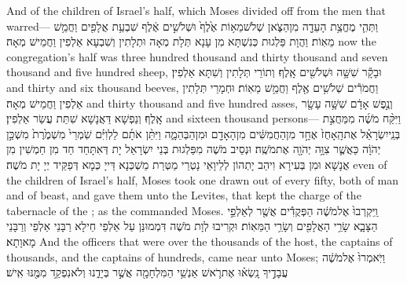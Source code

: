 {And of the children of Israel’s half, which Moses divided off from the men that warred—}{}
{וַתְּהִ֛י מֶחֱצַ֥ת הָעֵדָ֖ה מִן\maqqaf הַצֹּ֑אן שְׁלֹשׁ\maqqaf מֵא֥וֹת אֶ֙לֶף֙ וּשְׁלֹשִׁ֣ים אֶ֔לֶף שִׁבְעַ֥ת אֲלָפִ֖ים וַחֲמֵ֥שׁ מֵאֽוֹת׃}
{וַהֲוָת פַּלְגוּת כְּנִשְׁתָּא מִן עָנָא תְּלָת מְאָה וּתְלָתִין וְשִׁבְעָא אַלְפִין וַחֲמֵישׁ מְאָה׃}
{now the congregation’s half was three hundred thousand and thirty thousand and seven thousand and five hundred sheep,}{}
{וּבָקָ֕ר שִׁשָּׁ֥ה וּשְׁלֹשִׁ֖ים אָֽלֶף׃}
{וְתוֹרֵי תְּלָתִין וְשִׁתָּא אַלְפִין׃}
{and thirty and six thousand beeves,}{}
{וַחֲמֹרִ֕ים שְׁלֹשִׁ֥ים אֶ֖לֶף וַחֲמֵ֥שׁ מֵאֽוֹת׃}
{וּחְמָרֵי תְּלָתִין אַלְפִין וַחֲמֵישׁ מְאָה׃}
{and thirty thousand and five hundred asses,}{}
{וְנֶ֣פֶשׁ אָדָ֔ם שִׁשָּׁ֥ה עָשָׂ֖ר אָֽלֶף׃}
{וְנַפְשָׁא דַּאֲנָשָׁא שִׁתַּת עֲשַׂר אַלְפִין׃}
{and sixteen thousand persons—}{}
{וַיִּקַּ֨ח מֹשֶׁ֜ה מִמַּחֲצִ֣ת בְּנֵֽי\maqqaf יִשְׂרָאֵ֗ל אֶת\maqqaf הָֽאָחֻז֙ אֶחָ֣ד מִן\maqqaf הַחֲמִשִּׁ֔ים מִן\maqqaf הָאָדָ֖ם וּמִן\maqqaf הַבְּהֵמָ֑ה וַיִּתֵּ֨ן אֹתָ֜ם לַלְוִיִּ֗ם שֹֽׁמְרֵי֙ מִשְׁמֶ֙רֶת֙ מִשְׁכַּ֣ן יְהֹוָ֔ה כַּאֲשֶׁ֛ר צִוָּ֥ה יְהֹוָ֖ה אֶת\maqqaf מֹשֶֽׁה׃}
{וּנְסֵיב מֹשֶׁה מִפַּלְגוּת בְּנֵי יִשְׂרָאֵל יָת דְּאִתָּחַד חַד מִן חַמְשִׁין מִן אֲנָשָׁא וּמִן בְּעִירָא וִיהַב יָתְהוֹן לְלֵיוָאֵי נָטְרֵי מַטְּרַת מַשְׁכְּנָא דַּייָ כְּמָא דְּפַקֵּיד יְיָ יָת מֹשֶׁה׃}
{even of the children of Israel’s half, Moses took one drawn out of every fifty, both of man and of beast, and gave them unto the Levites, that kept the charge of the tabernacle of the \lord; as the \lord\space commanded Moses.}{}
{וַֽיִּקְרְבוּ֙ אֶל\maqqaf מֹשֶׁ֔ה הַפְּקֻדִ֕ים אֲשֶׁ֖ר לְאַלְפֵ֣י הַצָּבָ֑א שָׂרֵ֥י הָאֲלָפִ֖ים וְשָׂרֵ֥י הַמֵּאֽוֹת׃}
{וּקְרִיבוּ לְוָת מֹשֶׁה דִּמְמוּנַּן עַל אַלְפֵי חֵילָא רַבָּנֵי אַלְפֵי וְרַבָּנֵי מָאוָתָא׃}
{And the officers that were over the thousands of the host, the captains of thousands, and the captains of hundreds, came near unto Moses;}{}
{וַיֹּֽאמְרוּ֙ אֶל\maqqaf מֹשֶׁ֔ה עֲבָדֶ֣יךָ נָֽשְׂא֗וּ אֶת\maqqaf רֹ֛אשׁ אַנְשֵׁ֥י הַמִּלְחָמָ֖ה אֲשֶׁ֣ר בְּיָדֵ֑נוּ וְלֹא\maqqaf נִפְקַ֥ד מִמֶּ֖נּוּ אִֽישׁ׃}
